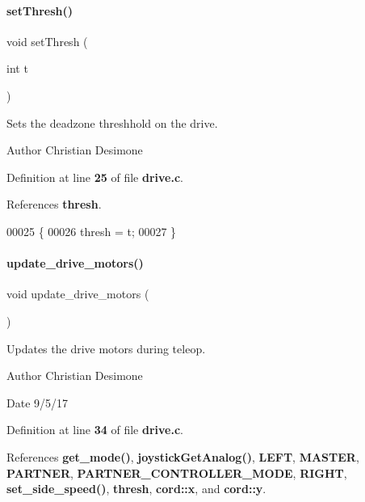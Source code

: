 \paragraph{set\+Thresh()}
{\footnotesize\ttfamily void set\+Thresh (\begin{DoxyParamCaption}\item[{int}]{t }\end{DoxyParamCaption})}



Sets the deadzone threshhold on the drive. 

\begin{DoxyAuthor}{Author}
Christian Desimone 
\end{DoxyAuthor}


Definition at line \textbf{ 25} of file \textbf{ drive.\+c}.



References \textbf{ thresh}.


\begin{DoxyCode}
00025                      \{
00026   thresh = t;
00027 \}
\end{DoxyCode}
\mbox{\label{drive_8c_a8224a4626a934d30ed587671b7004bf8}} 
\paragraph{update\+\_\+drive\+\_\+motors()}
{\footnotesize\ttfamily void update\+\_\+drive\+\_\+motors (\begin{DoxyParamCaption}{ }\end{DoxyParamCaption})}



Updates the drive motors during teleop. 

\begin{DoxyAuthor}{Author}
Christian Desimone 
\end{DoxyAuthor}
\begin{DoxyDate}{Date}
9/5/17 
\end{DoxyDate}


Definition at line \textbf{ 34} of file \textbf{ drive.\+c}.



References \textbf{ get\+\_\+mode()}, \textbf{ joystick\+Get\+Analog()}, \textbf{ L\+E\+FT}, \textbf{ M\+A\+S\+T\+ER}, \textbf{ P\+A\+R\+T\+N\+ER}, \textbf{ P\+A\+R\+T\+N\+E\+R\+\_\+\+C\+O\+N\+T\+R\+O\+L\+L\+E\+R\+\_\+\+M\+O\+DE}, \textbf{ R\+I\+G\+HT}, \textbf{ set\+\_\+side\+\_\+speed()}, \textbf{ thresh}, \textbf{ cord\+::x}, and \textbf{ cord\+::y}.




